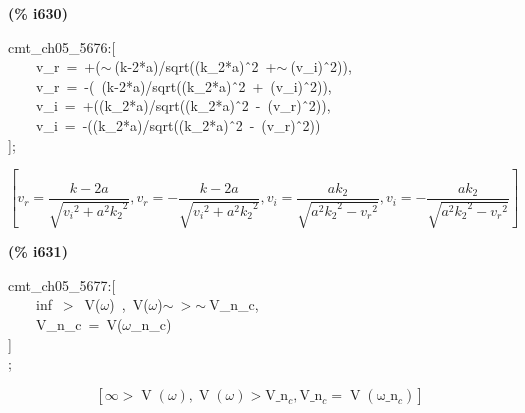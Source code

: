 \documentclass[fleqn]{article}
\begin{document}
\noindent
\begin{minipage}[t]{4.000000em}\color{red}\bfseries
(\% i630)	
\end{minipage}
\begin{minipage}[t]{\textwidth}\color{blue}
cmt\_ch05\_5676:[\\
\ \ \ \ v\_r\ =\ +(\ensuremath{\sim\ }(k-2*a)/sqrt((k\_2*a)\^\ 2\ +\ensuremath{\sim\ }(v\_i)\^\ 2)),\\
\ \ \ \ v\_r\ =\ -(\ (k-2*a)/sqrt((k\_2*a)\^\ 2\ +\ (v\_i)\^\ 2)),\\
\ \ \ \ v\_i\ =\ +((k\_2*a)/sqrt((k\_2*a)\^\ 2\ -\ (v\_r)\^\ 2)),\\
\ \ \ \ v\_i\ =\ -((k\_2*a)/sqrt((k\_2*a)\^\ 2\ -\ (v\_r)\^\ 2))\\
];
\end{minipage}
\[\displaystyle \tag{\% o630} 
\operatorname{[}{v_r}=\frac{k-2 a}{\sqrt{{{{v_i}}^{2}}+{{a}^{2}} {{{k_2}}^{2}}}}\operatorname{,}{v_r}=-\frac{k-2 a}{\sqrt{{{{v_i}}^{2}}+{{a}^{2}} {{{k_2}}^{2}}}}\operatorname{,}{v_i}=\frac{a {k_2}}{\sqrt{{{a}^{2}} {{{k_2}}^{2}}-{{{v_r}}^{2}}}}\operatorname{,}{v_i}=-\frac{a {k_2}}{\sqrt{{{a}^{2}} {{{k_2}}^{2}}-{{{v_r}}^{2}}}}\operatorname{]}\mbox{}
\]


\noindent
\begin{minipage}[t]{4.000000em}\color{red}\bfseries
(\% i631)	
\end{minipage}
\begin{minipage}[t]{\textwidth}\color{blue}
cmt\_ch05\_5677:[\\
\ \ \ \ inf\ \ensuremath{>}\ V(\ensuremath{\omega})\ ,\ V(\ensuremath{\omega})\ensuremath{\sim\ }\ensuremath{>}\ensuremath{\sim\ }V\_n\_c,\\
\ \ \ \ V\_n\_c\ =\ V(\ensuremath{\omega}\_n\_c)\\
]\\
;
\end{minipage}
\[\displaystyle \tag{\% o631} 
\left[ \infty \operatorname{>  }\operatorname{V}\left( \omega \right) \operatorname{,}\operatorname{V}\left( \omega \right) \operatorname{>  }{{\ensuremath{\mathrm{V\_ n}}}_c}\operatorname{,}{{\ensuremath{\mathrm{V\_ n}}}_c}=\operatorname{V}\left( {{\ensuremath{\mathrm{\omega \_ n}}}_c}\right) \right] \mbox{}
\]
\end{document}
